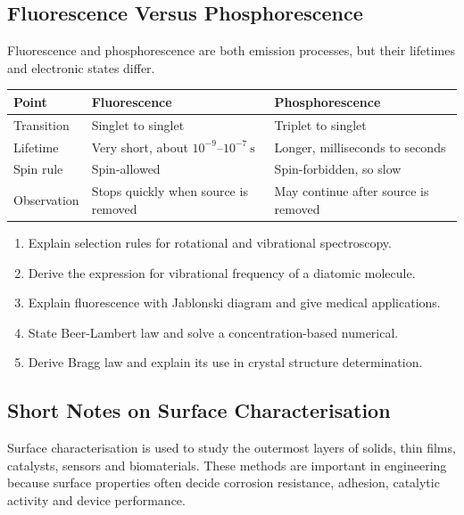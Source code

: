 \documentclass[12pt,a4paper]{article}
\begin{document}
\subsection{Fluorescence Versus Phosphorescence}
Fluorescence and phosphorescence are both emission processes, but their lifetimes and electronic states differ.

\begin{tabularx}{\linewidth}{|B{3cm}|Y|Y|}
\hline
\textbf{Point} & \textbf{Fluorescence} & \textbf{Phosphorescence} \\
\hline
Transition & Singlet to singlet & Triplet to singlet \\
\hline
Lifetime & Very short, about $10^{-9}$--$10^{-7}\ \mathrm{s}$ & Longer, milliseconds to seconds \\
\hline
Spin rule & Spin-allowed & Spin-forbidden, so slow \\
\hline
Observation & Stops quickly when source is removed & May continue after source is removed \\
\hline
\end{tabularx}

\begin{tcolorbox}[masonbox, title={Previous-Year Style Questions}]
\begin{enumerate}[leftmargin=*, itemsep=4pt, topsep=2pt]
  \item Explain selection rules for rotational and vibrational spectroscopy.
  \item Derive the expression for vibrational frequency of a diatomic molecule.
  \item Explain fluorescence with Jablonski diagram and give medical applications.
  \item State Beer-Lambert law and solve a concentration-based numerical.
  \item Derive Bragg law and explain its use in crystal structure determination.
\end{enumerate}
\end{tcolorbox}

\subsection{Short Notes on Surface Characterisation}
Surface characterisation is used to study the outermost layers of solids, thin films, catalysts, sensors and biomaterials. These methods are important in engineering because surface properties often decide corrosion resistance, adhesion, catalytic activity and device performance.
\end{document}
